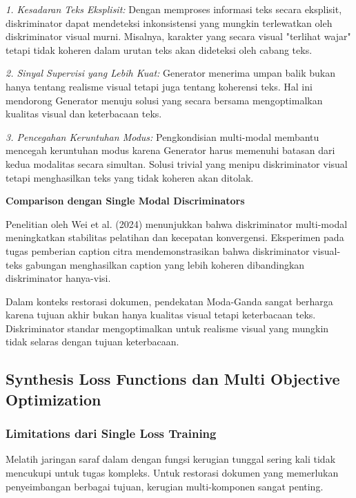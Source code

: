 \documentclass[12pt,a4paper]{article}
\begin{document}
\textit{1. Kesadaran Teks Eksplisit:} Dengan memproses informasi teks secara eksplisit, diskriminator dapat mendeteksi inkonsistensi yang mungkin terlewatkan oleh diskriminator visual murni. Misalnya, karakter yang secara visual "terlihat wajar" tetapi tidak koheren dalam urutan teks akan dideteksi oleh cabang teks.

\textit{2. Sinyal Supervisi yang Lebih Kuat:} Generator menerima umpan balik bukan hanya tentang realisme visual tetapi juga tentang koherensi teks. Hal ini mendorong Generator menuju solusi yang secara bersama mengoptimalkan kualitas visual dan keterbacaan teks.

\textit{3. Pencegahan Keruntuhan Modus:} Pengkondisian multi-modal membantu mencegah keruntuhan modus karena Generator harus memenuhi batasan dari kedua modalitas secara simultan. Solusi trivial yang menipu diskriminator visual tetapi menghasilkan teks yang tidak koheren akan ditolak.

\textbf{Comparison dengan Single Modal Discriminators}

Penelitian oleh Wei et al. (2024) menunjukkan bahwa diskriminator multi-modal meningkatkan stabilitas pelatihan dan kecepatan konvergensi. Eksperimen pada tugas pemberian caption citra mendemonstrasikan bahwa diskriminator visual-teks gabungan menghasilkan caption yang lebih koheren dibandingkan diskriminator hanya-visi.

Dalam konteks restorasi dokumen, pendekatan Moda-Ganda sangat berharga karena tujuan akhir bukan hanya kualitas visual tetapi keterbacaan teks. Diskriminator standar mengoptimalkan untuk realisme visual yang mungkin tidak selaras dengan tujuan keterbacaan.

\subsection{Synthesis Loss Functions dan Multi Objective Optimization}
\label{subsec:loss-functions}

\subsubsection{Limitations dari Single Loss Training}
\label{subsubsec:single-loss-limits}

Melatih jaringan saraf dalam dengan fungsi kerugian tunggal sering kali tidak mencukupi untuk tugas kompleks. Untuk restorasi dokumen yang memerlukan penyeimbangan berbagai tujuan, kerugian multi-komponen sangat penting.
\end{document}
